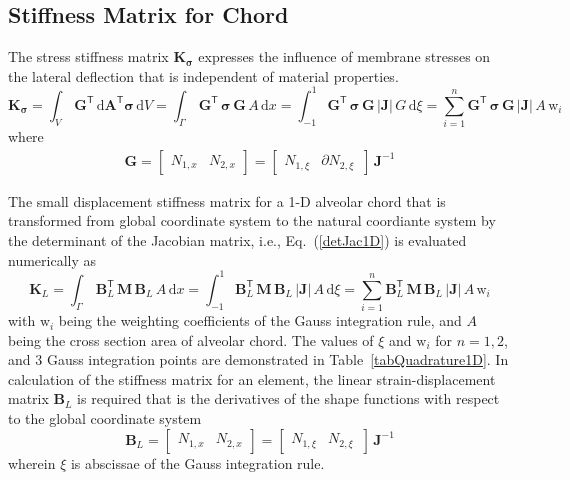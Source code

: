 \subsection{Stiffness Matrix for Chord}
The stress stiffness matrix $\mathbf{K}_{\boldsymbol{\sigma}}$ expresses the influence of membrane stresses on the lateral deflection that is independent of material properties.
\begin{equation}
\mathbf{K}_{\boldsymbol{\sigma}} = \int_{V} \, \mathbf{G}^{\mathsf{T}} \, \mathrm{d} \mathbf{A}^{\mathsf{T}} \boldsymbol{\sigma} \, \mathrm{d} V = \int_{\Gamma} \, \mathbf{G}^{\mathsf{T}} \,  \boldsymbol{\sigma} \, \mathbf{G} \, A \, \mathrm{d} x 
= \int_{-1}^{1} \mathbf{G}^{\mathsf{T}} \,  \boldsymbol{\sigma} \, \mathbf{G} \, |\mathbf{J}|  \, G \,  \mathrm{d} \xi =  \sum_{i=1}^{n}  \mathbf{G}^{\mathsf{T}} \,  \boldsymbol{\sigma} \, \mathbf{G}  \, |\mathbf{J}| \, A \, \mathrm{w}_i
\end{equation}
where 
\begin{equation}
\begin{aligned}
\mathbf{G} = \begin{bmatrix}
 N_{1,x} &  N_{2,x}
\end{bmatrix} = \begin{bmatrix}
 N_{1,\xi} &  \partial N_{2,\xi} \, 
\end{bmatrix} \, \mathbf{J}^{-1}
\end{aligned}
\end{equation}


The small displacement stiffness matrix for a 1-D alveolar chord that is transformed from global coordinate system to the natural coordiante system by the determinant of the Jacobian matrix, i.e., Eq.~(\ref{detJac1D}) is evaluated numerically as 
\begin{equation}
\mathbf{K}_{L} = \int_{\Gamma} \, \mathbf{B}_L^{\mathsf{T}} \, \mathbf{M} \, \mathbf{B}_L \, A \, \mathrm{d} x  = \int_{-1}^{1} \mathbf{B}_L^{\mathsf{T}} \, \mathbf{M} \, \mathbf{B}_L \, |\mathbf{J}|  \, A \,  \mathrm{d} \xi =  \sum_{i=1}^{n}  \mathbf{B}_L^{\mathsf{T}} \, \mathbf{M} \, \mathbf{B}_L \, |\mathbf{J}| \, A \, \mathrm{w}_i
\end{equation}
with $\mathrm{w}_i$ being the  weighting coefficients of the Gauss integration rule, and $A$ being the cross section area of alveolar chord. The values of $\xi$ and $\mathrm{w}_i$ for $n = 1, 2$, and $3$ Gauss integration points are demonstrated in Table~\ref{tabQuadrature1D}.
In calculation of the stiffness matrix for an element, the linear strain-displacement matrix $\mathbf{B}_L$ is required that is the derivatives of the shape functions with respect to the global coordinate system  
\begin{equation}
\mathbf{B}_L = \begin{bmatrix}
 N_{1,x} &   N_{2,x}
\end{bmatrix} = \begin{bmatrix}
 N_{1,\xi} &   N_{2,\xi} \, 
\end{bmatrix} \, \mathbf{J}^{-1}
\end{equation}
wherein $\xi$ is abscissae of the Gauss integration rule. 

